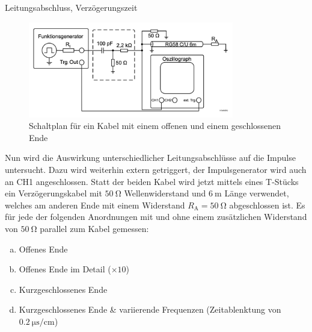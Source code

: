 \documentclass[ngerman]{scrartcl}
\theoremstyle{definition}
\begin{document}
		\begin{aufgabe}{Leitungsabschluss, Verzögerungszeit}
			\begin{figure}[h!]
				\centering
				\includegraphics[width=0.8\textwidth]{Aufbau_1_3_Leitungsabschluss.png}
				\caption{Schaltplan für ein Kabel mit einem offenen und einem geschlossenen Ende~\cite{anleitung}}
				\label{fig:aufbau_1_3_leitungsabschluss}
			\end{figure}
			Nun wird die Auswirkung unterschiedlicher Leitungsabschlüsse auf die Impulse untersucht. Dazu wird weiterhin extern getriggert, der Impulsgenerator wird auch an CH1 angeschlossen. Statt der beiden Kabel wird jetzt mittels eines T-Stücks ein Verzögerungskabel mit $\SI{50}{\ohm}$ Wellenwiderstand und $\SI{6}{\meter}$ Länge verwendet, welches am anderen Ende mit einem Widerstand $R_\mathrm{A} = \SI{50}{\ohm}$ abgeschlossen ist. Es für jede der folgenden Anordnungen mit und ohne einem zusätzlichen Widerstand von $\SI{50}{\ohm}$ parallel zum Kabel gemessen:
			\begin{enumerate}[(a)]
				\item Offenes Ende
				\item Offenes Ende im Detail ($\times 10$)
				\item Kurzgeschlossenes Ende
				\item Kurzgeschlossenes Ende \& variierende Frequenzen (Zeitablenktung von $\SI{0.2}{\micro\second\per\centi\meter}$)
			\end{enumerate}
		\end{aufgabe}
\end{document}
